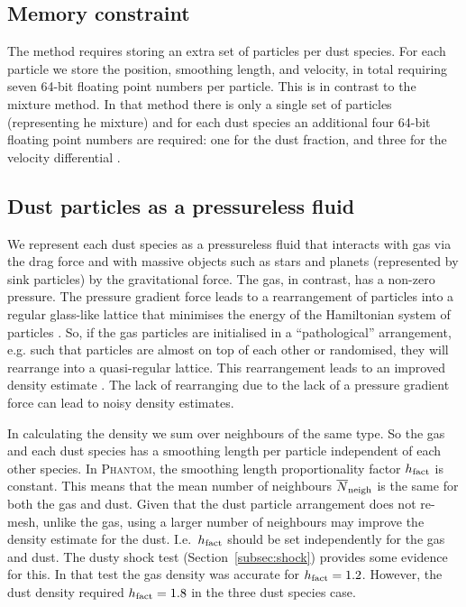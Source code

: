 \documentclass[fleqn,usenatbib]{mnras}
\begin{document}
\subsection{Memory constraint}

The method requires storing an extra set of particles per dust species. For each
particle we store the position, smoothing length, and velocity, in total
requiring seven 64-bit floating point numbers per particle. This is in contrast
to the mixture method. In that method there is only a single set of particles
(representing he mixture) and for each dust species an additional four 64-bit
floating point numbers are required: one for the dust fraction, and three for
the velocity differential \citep{Hutchison2018MNRAS.476.2186H}.


\subsection{Dust particles as a pressureless fluid}

We represent each dust species as a pressureless fluid that interacts with gas
via the drag force and with massive objects such as stars and planets
(represented by sink particles) by the gravitational force. The gas, in
contrast, has a non-zero pressure. The pressure gradient force leads to a
rearrangement of particles into a regular glass-like lattice
\citep{Monaghan2005RPPh...68.1703M} that minimises the energy of the Hamiltonian
system of particles \citep{Price2012JCoPh.231..759P}. So, if the gas particles
are initialised in a ``pathological'' arrangement, e.g. such that particles are
almost on top of each other or randomised, they will rearrange into a
quasi-regular lattice. This rearrangement leads to an improved density estimate
\citep{Price2012JCoPh.231..759P}. The lack of rearranging due to the lack of a
pressure gradient force can lead to noisy density estimates.

In calculating the density we sum over neighbours of the same type. So the gas
and each dust species has a smoothing length per particle independent of each
other species. In \textsc{Phantom}, the smoothing length proportionality factor
\(h_{\rm fact}\) is constant. This means that the mean number of neighbours
\(\overline{N}_{\rm neigh}\) is the same for both the gas and dust. Given that
the dust particle arrangement does not re-mesh, unlike the gas, using a larger
number of neighbours may improve the density estimate for the dust. I.e.\
\(h_{\rm fact}\) should be set independently for the gas and dust. The dusty
shock test (Section~\ref{subsec:shock}) provides some evidence for this. In
that test the gas density was accurate for \(h_{\rm fact} = 1.2\). However, the
dust density required \(h_{\rm fact} = 1.8\) in the three dust species case.
\end{document}
